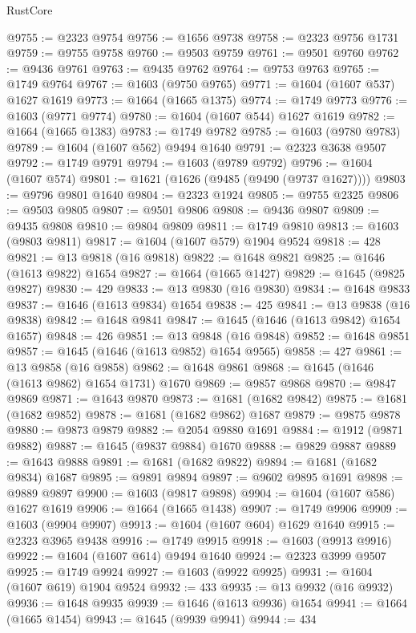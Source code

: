 \begin{lexlean}{RustCore}
\begin{coremodule}
@9755 := @2323 @9754
@9756 := @1656 @9738
@9758 := @2323 @9756 @1731
@9759 := @9755 @9758
@9760 := @9503 @9759
@9761 := @9501 @9760
@9762 := @9436 @9761
@9763 := @9435 @9762
@9764 := @9753 @9763
@9765 := @1749 @9764
@9767 := @1603 (@9750 @9765)
@9771 := @1604 (@1607 @537) @1627 @1619
@9773 := @1664 (@1665 @1375)
@9774 := @1749 @9773
@9776 := @1603 (@9771 @9774)
@9780 := @1604 (@1607 @544) @1627 @1619
@9782 := @1664 (@1665 @1383)
@9783 := @1749 @9782
@9785 := @1603 (@9780 @9783)
@9789 := @1604 (@1607 @562) @9494 @1640
@9791 := @2323 @3638 @9507
@9792 := @1749 @9791
@9794 := @1603 (@9789 @9792)
@9796 := @1604 (@1607 @574)
@9801 := @1621 (@1626 (@9485 (@9490 (@9737 @1627))))
@9803 := @9796 @9801 @1640
@9804 := @2323 @1924
@9805 := @9755 @2325
@9806 := @9503 @9805
@9807 := @9501 @9806
@9808 := @9436 @9807
@9809 := @9435 @9808
@9810 := @9804 @9809
@9811 := @1749 @9810
@9813 := @1603 (@9803 @9811)
@9817 := @1604 (@1607 @579) @1904 @9524
@9818 := 428
@9821 := @13 @9818 (@16 @9818)
@9822 := @1648 @9821
@9825 := @1646 (@1613 @9822) @1654
@9827 := @1664 (@1665 @1427)
@9829 := @1645 (@9825 @9827)
@9830 := 429
@9833 := @13 @9830 (@16 @9830)
@9834 := @1648 @9833
@9837 := @1646 (@1613 @9834) @1654
@9838 := 425
@9841 := @13 @9838 (@16 @9838)
@9842 := @1648 @9841
@9847 := @1645 (@1646 (@1613 @9842) @1654 @1657)
@9848 := 426
@9851 := @13 @9848 (@16 @9848)
@9852 := @1648 @9851
@9857 := @1645 (@1646 (@1613 @9852) @1654 @9565)
@9858 := 427
@9861 := @13 @9858 (@16 @9858)
@9862 := @1648 @9861
@9868 := @1645 (@1646 (@1613 @9862) @1654 @1731) @1670
@9869 := @9857 @9868
@9870 := @9847 @9869
@9871 := @1643 @9870
@9873 := @1681 (@1682 @9842)
@9875 := @1681 (@1682 @9852)
@9878 := @1681 (@1682 @9862) @1687
@9879 := @9875 @9878
@9880 := @9873 @9879
@9882 := @2054 @9880 @1691
@9884 := @1912 (@9871 @9882)
@9887 := @1645 (@9837 @9884) @1670
@9888 := @9829 @9887
@9889 := @1643 @9888
@9891 := @1681 (@1682 @9822)
@9894 := @1681 (@1682 @9834) @1687
@9895 := @9891 @9894
@9897 := @9602 @9895 @1691
@9898 := @9889 @9897
@9900 := @1603 (@9817 @9898)
@9904 := @1604 (@1607 @586) @1627 @1619
@9906 := @1664 (@1665 @1438)
@9907 := @1749 @9906
@9909 := @1603 (@9904 @9907)
@9913 := @1604 (@1607 @604) @1629 @1640
@9915 := @2323 @3965 @9438
@9916 := @1749 @9915
@9918 := @1603 (@9913 @9916)
@9922 := @1604 (@1607 @614) @9494 @1640
@9924 := @2323 @3999 @9507
@9925 := @1749 @9924
@9927 := @1603 (@9922 @9925)
@9931 := @1604 (@1607 @619) @1904 @9524
@9932 := 433
@9935 := @13 @9932 (@16 @9932)
@9936 := @1648 @9935
@9939 := @1646 (@1613 @9936) @1654
@9941 := @1664 (@1665 @1454)
@9943 := @1645 (@9939 @9941)
@9944 := 434

\end{coremodule}
\end{lexlean}
